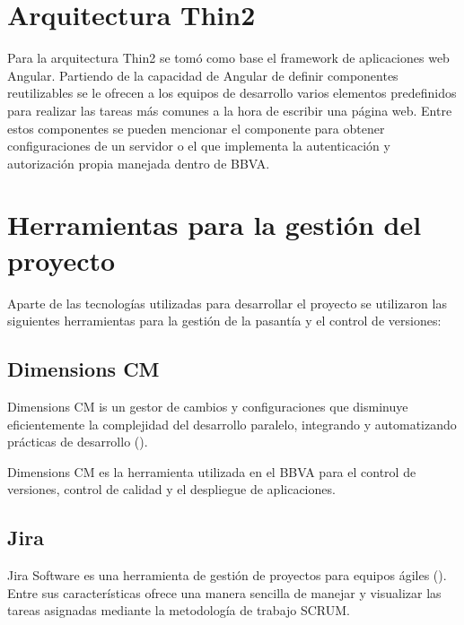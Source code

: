 \section{Arquitectura Thin2}

Para la arquitectura Thin2 se tomó como base el framework de aplicaciones web Angular. Partiendo
de la capacidad de Angular de definir componentes reutilizables se le ofrecen a los
equipos de desarrollo varios elementos predefinidos para realizar las tareas más
comunes a la hora de escribir una página web. Entre estos componentes se pueden
mencionar el componente para obtener configuraciones de un servidor o el que implementa
la autenticación y autorización propia manejada dentro de BBVA.

\section{Herramientas para la gestión del proyecto}

Aparte de las tecnologías utilizadas para desarrollar el proyecto se utilizaron
las siguientes herramientas para la gestión de la pasantía y el control de versiones:

\subsection{Dimensions CM}

Dimensions CM is un gestor de cambios y configuraciones que disminuye eficientemente
la complejidad del desarrollo paralelo, integrando y automatizando prácticas de desarrollo
(\cite{DIMENSIONS}).

Dimensions CM es la herramienta utilizada en el BBVA para el control de versiones, control de
calidad y el despliegue de aplicaciones.

\subsection{Jira}

Jira Software es una herramienta de gestión de proyectos para equipos ágiles (\cite{JIRA}).
Entre sus características ofrece una manera sencilla de manejar y visualizar
las tareas asignadas mediante la metodología de trabajo SCRUM.

